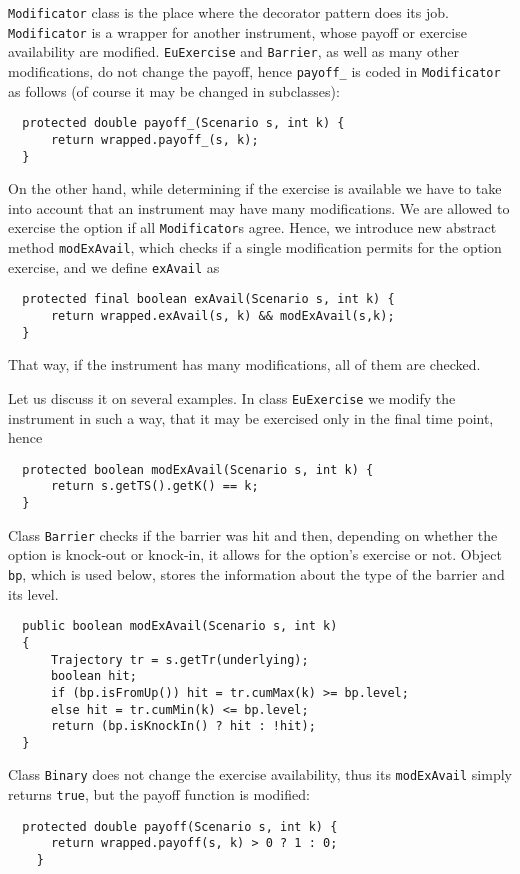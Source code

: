 \documentclass[a4paper,11pt, twoside]{book}
\newenvironment{absolutelynopagebreak}
  {\par\nobreak\vfill\penalty0\vfilneg
   \vtop\bgroup}
  {\par\xdef\tpd{\the\prevdepth}\egroup
   \prevdepth=\tpd}
\theoremstyle{definition}
\theoremstyle{remark}
\newcounter{example}[chapter]
\begin{document}
\texttt{Modificator} class is the place where the decorator pattern does its job. \texttt{Modificator} is a wrapper for another instrument, whose payoff or exercise availability are modified. \texttt{EuExercise} and \texttt{Barrier}, as well as many other modifications, do not change the payoff, hence \texttt{payoff\_} is coded in \texttt{Modificator} as follows (of course it may be changed in subclasses):
\begin{lstlisting}
  protected double payoff_(Scenario s, int k) {
      return wrapped.payoff_(s, k);
  }
\end{lstlisting}
On the other hand, while determining if the exercise is available we have to take into account that an instrument may have many modifications. We are allowed to exercise the option if all \texttt{Modificator}s agree. Hence, we introduce new abstract method \texttt{modExAvail}, which checks if a single modification permits for the option exercise, and we define \texttt{exAvail} as
\begin{lstlisting}
  protected final boolean exAvail(Scenario s, int k) {
      return wrapped.exAvail(s, k) && modExAvail(s,k);
  }
\end{lstlisting}
That way, if the instrument has many modifications, all of them are checked.

Let us discuss it on several examples. In class \texttt{EuExercise} we modify the instrument in such a way, that it may be exercised only in the final time point, hence
\begin{lstlisting}
  protected boolean modExAvail(Scenario s, int k) {
      return s.getTS().getK() == k;
  }
\end{lstlisting}
Class \texttt{Barrier} checks if the barrier was hit and then, depending on whether the option is knock-out or knock-in, it allows for the option's exercise or not. Object \texttt{bp}, which is used below, stores the information about the type of the barrier and its level.
\begin{lstlisting}
  public boolean modExAvail(Scenario s, int k)
  {
      Trajectory tr = s.getTr(underlying);
      boolean hit;
      if (bp.isFromUp()) hit = tr.cumMax(k) >= bp.level;
      else hit = tr.cumMin(k) <= bp.level;
      return (bp.isKnockIn() ? hit : !hit);
  }
\end{lstlisting}

Class \texttt{Binary} does not change the exercise availability, thus its \texttt{modExAvail} simply returns \texttt{true}, but the payoff function is modified:
\begin{lstlisting}
  protected double payoff(Scenario s, int k) {
      return wrapped.payoff(s, k) > 0 ? 1 : 0;
    }
\end{lstlisting}
	
\end{document}
